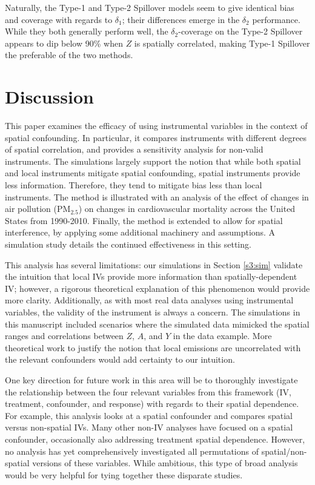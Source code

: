 \documentclass[12pt]{article}
\begin{document}
Naturally, the Type-1 and Type-2 Spillover models seem to give identical bias and coverage with regards to $\delta_1$; their differences emerge in the $\delta_2$ performance. While they both generally perform well, the $\delta_2$-coverage on the Type-2 Spillover appears to dip below 90\% when $Z$ is spatially correlated, making Type-1 Spillover the preferable of the two methods. 


\section{Discussion}\label{s3:discussion}

This paper examines the efficacy of using instrumental variables in the context of spatial confounding. In particular, it compares instruments with different degrees of spatial correlation, and provides a sensitivity analysis for non-valid instruments.  The simulations largely support the notion that while both spatial and local instruments mitigate spatial confounding, spatial instruments provide less information.  Therefore, they tend to mitigate bias less than local instruments. 
The method is illustrated with an analysis of the effect of changes in air pollution (PM$_{2.5}$) on changes in cardiovascular mortality across the United States from 1990-2010. Finally, the method is extended to allow for spatial interference, by applying some additional machinery and assumptions. A simulation study details the continued effectiveness in this setting.


This analysis has several limitations: our simulations in Section \ref{s3:sim} validate the intuition that local IVs provide more information than spatially-dependent IV; however, a rigorous theoretical explanation of this phenomenon would provide more clarity. Additionally, as with most real data analyses using instrumental variables, the validity of the instrument is always a concern. The simulations in this manuscript included scenarios where the simulated data mimicked the spatial ranges and correlations between $Z$, $A$, and $Y$ in the data example. More theoretical work to justify the notion that local emissions are uncorrelated with the relevant confounders would add certainty to our intuition. 

One key direction for future work in this area will be to thoroughly investigate the relationship between the four relevant variables from this framework  (IV, treatment, confounder, and response) with regards to their spatial dependence. For example, this analysis looks at a spatial confounder and compares spatial versus non-spatial IVs. Many other non-IV analyses have focused on a spatial confounder, occasionally also addressing treatment spatial dependence. However, no analysis has yet comprehensively investigated all permutations of spatial/non-spatial versions of these variables. While ambitious, this type of broad analysis would be very helpful for tying together these disparate studies. 
\end{document}
